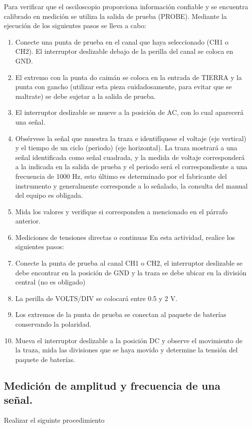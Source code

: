 \documentclass[11pt]{article}
\begin{document}
\begin{multicols}{2}
		Para verificar que el osciloscopio proporciona información confiable y se encuentra calibrado en medición se utiliza la salida de prueba (PROBE). Mediante la ejecución de los siguientes pasos se lleva a cabo:
		\begin{enumerate}
			\item  Conecte una punta de prueba en el canal que haya seleccionado (CH1 o CH2). El interruptor deslizable debajo de la perilla del canal se coloca en GND.
			\item  El extremo con la punta do caimán se coloca en la entrada de TIERRA y la punta con gancho (utilizar esta pieza cuidadosamente, para evitar que se maltrate) se debe sujetar a la salida de prueba.
			\item  El interruptor deslizable se mueve a la posición de AC, con lo cual aparecerá una señal.
			\item  Obsérvese la señal que muestra la traza e identifíquese el voltaje (eje vertical) y el tiempo de un ciclo (periodo) (eje horizontal). La traza mostrará a una señal identificada como señal cuadrada, y la medida de voltaje corresponderá a la indicada en la salida de prueba y el periodo será el correspondiente a una frecuencia de 1000 Hz, esto último es determinado por el fabricante del instrumento y generalmente corresponde a lo señalado, la consulta del manual del equipo es obligada.
			\item  Mida los valores y verifique si corresponden a mencionado en el párrafo anterior.
			
			\item Mediciones de tensiones directas o continuas
			En esta actividad, realice los siguientes pasos:
			\item  Conecte la punta de prueba al canal CH1 o CH2, el interruptor deslizable se debe encontrar en la posición de GND y la traza se debe ubicar en la división central (no es obligado)
			\item  La perilla de VOLTS/DIV se colocará entre 0.5 y 2 V.
			\item  Los extremos de la punta de prueba se conectan al paquete de baterías conservando la polaridad.
			\item  Mueva el interruptor deslizable a la posición DC y observe el movimiento de la traza, mida las divisiones que se haya movido y determine la tensión del paquete de baterías.
		\end{enumerate}
				

	\subsection{Medición de amplitud y frecuencia de una señal.}
		Realizar el siguinte procedimiento


\end{multicols}
\end{document}
